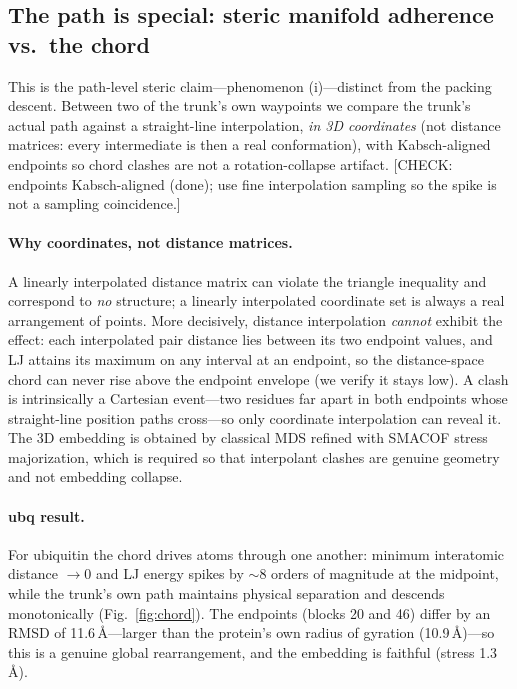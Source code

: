 \documentclass[11pt]{article}
\newcommand{\CHECK}[1]{{\color{orange!80!black}\small\textsf{[CHECK: #1]}}}
\begin{document}
\subsection{The path is special: steric manifold adherence vs.\ the chord}
\label{sec:chord}

This is the path-level steric claim---phenomenon (i)---distinct from the packing
descent. Between two of the trunk's own waypoints we compare the trunk's actual
path against a straight-line interpolation, \emph{in 3D coordinates} (not distance
matrices: every intermediate is then a real conformation), with Kabsch-aligned
endpoints so chord clashes are not a rotation-collapse artifact.
\CHECK{endpoints Kabsch-aligned (done); use fine interpolation sampling so the
spike is not a sampling coincidence.}

\paragraph{Why coordinates, not distance matrices.}
A linearly interpolated distance matrix can violate the triangle inequality and
correspond to \emph{no} structure; a linearly interpolated coordinate set is
always a real arrangement of points. More decisively, distance interpolation
\emph{cannot} exhibit the effect: each interpolated pair distance lies between its
two endpoint values, and LJ attains its maximum on any interval at an endpoint, so
the distance-space chord can never rise above the endpoint envelope (we verify it
stays low). A clash is intrinsically a Cartesian event---two residues far apart in
both endpoints whose straight-line position paths cross---so only coordinate
interpolation can reveal it. The 3D embedding is obtained by classical MDS refined
with SMACOF stress majorization, which is required so that interpolant clashes are
genuine geometry and not embedding collapse.

\paragraph{ubq result.}
For ubiquitin the chord drives atoms through one another: minimum interatomic
distance $\to 0$ and LJ energy spikes by $\sim$8 orders of magnitude at the
midpoint, while the trunk's own path maintains physical separation and descends
monotonically (Fig.~\ref{fig:chord}). The endpoints (blocks 20 and 46) differ by
an RMSD of 11.6\,\AA---larger than the protein's own radius of gyration
(10.9\,\AA)---so this is a genuine global rearrangement, and the embedding is
faithful (stress 1.3\,\AA).
\end{document}
